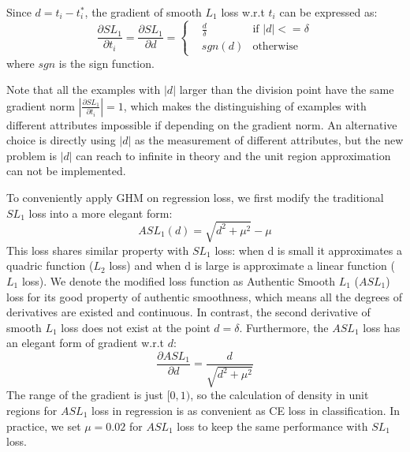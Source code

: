\documentclass[letterpaper]{article} \usepackage{aaai19}  \usepackage{times}  \usepackage{helvet}  \usepackage{courier}  \usepackage{url}  \usepackage{graphicx}  \usepackage{amsmath,amssymb}
\begin{document}
Since $d = t_i - t_i^*$, the gradient of smooth $L_1$ loss w.r.t $t_i$ can be expressed as:
\begin{equation}
\label{eq:g_smoothl1}
    \frac{\partial SL_1}{\partial t_i} = \frac{\partial SL_1}{\partial d} = \left\{ 
    \begin{aligned}
        & \frac{d}{\delta} & \text{if }  |d| <= \delta \\
        & sgn(d) & \text{otherwise}
    \end{aligned}
    \right.
\end{equation}
where $sgn$ is the sign function. 

Note that all the examples with $|d|$ larger than the division point have the same gradient norm $|\frac{\partial SL_1}{\partial t_i}| = 1$, which makes the distinguishing of examples with different attributes impossible if depending on the gradient norm. An alternative choice is directly using $|d|$ as the measurement of different attributes, but the new problem is $|d|$ can reach to infinite in theory and the unit region approximation can not be implemented.

To conveniently apply  GHM on regression loss, we first modify the traditional $SL_1$ loss into a more elegant form:
\begin{equation}
\label{eq:asl1}
    ASL_1(d) = \sqrt{d^2 + \mu^2} - \mu
\end{equation}
This loss shares similar property with $SL_1$ loss: when d is small it approximates a quadric function ($L_2$ loss) and when d is large is approximate a linear function ($L_1$ loss). We denote the modified loss function as Authentic Smooth $L_1$ ($ASL_1$) loss for its good property of authentic smoothness, which means all the degrees of derivatives are existed and continuous. In contrast, the second derivative of smooth $L_1$ loss does not exist at the point $d = \delta$. Furthermore, the $ASL_1$ loss has an elegant form of gradient w.r.t $d$:
\begin{equation}
\label{eq:g_asl1}
    \frac{\partial ASL_1}{\partial d} = \frac{d}{\sqrt{d^2 + \mu^2}}
\end{equation}
The range of the gradient is just $[0,1)$, so the calculation of density in unit regions for $ASL_1$ loss in regression is as convenient as CE loss in classification. In practice, we set $\mu = 0.02$ for $ASL_1$ loss to keep the same performance with $SL_1$ loss.
\end{document}
